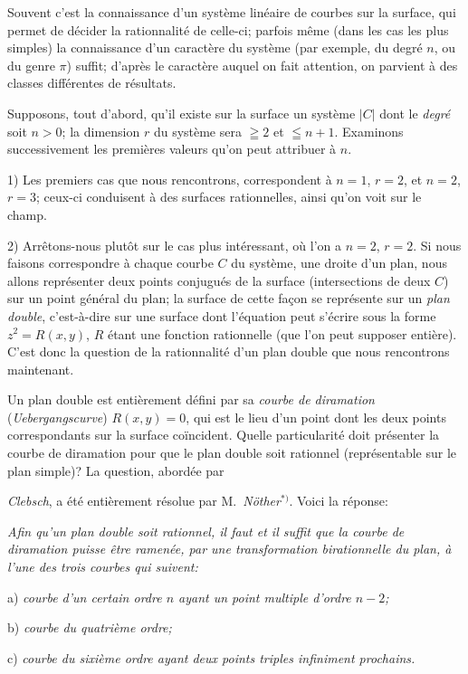 \documentclass{article}
\begin{document}
Souvent c'est la connaissance d'un système linéaire de courbes sur la surface, qui permet de décider la rationnalité de celle-ci; parfois même (dans les cas les plus simples) la connaissance d'un caractère du système (par exemple, du degré $n$, ou du genre $\pi$) suffit; d'après le caractère auquel on fait attention, on parvient à des classes différentes de résultats.

Supposons, tout d'abord, qu'il existe sur la surface un système $|C|$ dont le \emph{degré} soit $n > 0$; la dimension $r$ du système sera $\geqq 2$ et $\leqq n + 1$. Examinons successivement les premières valeurs qu'on peut attribuer à $n$.

1) Les premiers cas que nous rencontrons, correspondent à $n = 1$, $r = 2$, et $n = 2$, $r = 3$; ceux-ci conduisent à des surfaces rationnelles, ainsi qu'on voit sur le champ.

2) Arrêtons-nous plutôt sur le cas plus intéressant, où l'on a $n = 2$, $r = 2$. Si nous faisons correspondre à chaque courbe $C$ du système, une droite d'un plan, nous allons représenter deux points conjugués de la surface (intersections de deux $C$) sur un point général du plan; la surface de cette façon se représente sur un \emph{plan double}, c'est-à-dire sur une surface dont l'équation peut s'écrire sous la forme $z^{2} = R(x, y)$, $R$ étant une fonction rationnelle (que l'on peut supposer entière). C'est donc la question de la rationnalité d'un plan double que nous rencontrons maintenant.

Un plan double est entièrement défini par sa \emph{courbe de diramation} (\emph{Uebergangscurve}) $R(x, y) = 0$, qui est le lieu d'un point dont les deux points correspondants sur la surface coïncident. Quelle particularité doit présenter la courbe de diramation pour que le plan double soit rationnel (représentable sur le plan simple)? La question, abordée par

\emph{Clebsch}, a été entièrement résolue par M.\ \emph{Nöther}${}^{*)}$. Voici la réponse:

\emph{Afin qu'un plan double soit rationnel, il faut et il suffit que la courbe de diramation puisse être ramenée, par une transformation birationnelle du plan, à l'une des trois courbes qui suivent:}

a) \emph{courbe d'un certain ordre $n$ ayant un point multiple d'ordre $n - 2$;}

b) \emph{courbe du quatrième ordre;}

c) \emph{courbe du sixième ordre ayant deux points triples infiniment prochains.}
\end{document}
